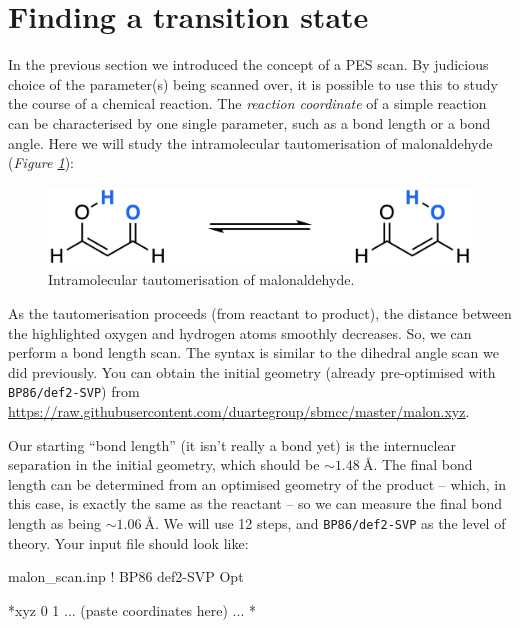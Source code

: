 \documentclass[10pt]{article}
\newcommand{\figref}[1]{\textit{Figure \ref{fig:#1}}}
\begin{document}
\section{Finding a transition state}

In the previous section we introduced the concept of a PES scan. By judicious choice of the parameter(s) being scanned over, it is possible to use this to study the course of a chemical reaction. The \textit{reaction coordinate} of a simple reaction can be characterised by one single parameter, such as a bond length or a bond angle. Here we will study the intramolecular tautomerisation of malonaldehyde (\figref{taut}):

\begin{figure}[H]
    \centering
    \includegraphics[scale=0.8]{./img/taut}
    \caption{Intramolecular tautomerisation of malonaldehyde.}
    \label{fig:taut}
\end{figure}

As the tautomerisation proceeds (from reactant to product), the distance between the highlighted oxygen and hydrogen atoms smoothly decreases. So, we can perform a bond length scan. The syntax is similar to the dihedral angle scan we did previously. You can obtain the initial geometry (already pre-optimised with \texttt{BP86/def2-SVP}) from \url{https://raw.githubusercontent.com/duartegroup/sbmcc/master/malon.xyz}.

Our starting ``bond length'' (it isn't really a bond yet) is the internuclear separation in the initial geometry, which should be \(\sim \SI{1.48}{\angstrom}\). The final bond length can be determined from an optimised geometry of the product -- which, in this case, is exactly the same as the reactant -- so we can measure the final bond length as being \(\sim \SI{1.06}{\angstrom}\). We will use 12 steps, and \texttt{BP86/def2-SVP} as the level of theory. Your input file should look like:

\begin{script}{malon\_scan.inp}
! BP86 def2-SVP Opt



*xyz 0 1
 ... (paste coordinates here) ...
*
\end{script}
\end{document}
